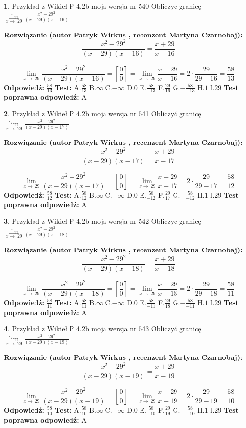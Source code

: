 \documentclass[12pt, a4paper]{article}
\theoremstyle{definition} %
\newtheorem{zad}{}
\newcommand{\zadStart}[1]{\begin{zad}#1\newline}
\newcommand{\zadStop}{\end{zad}}
\newcommand{\rozwStart}[2]{\noindent \textbf{Rozwiązanie (autor #1 , recenzent #2): }\newline}
\newcommand{\rozwStop}{\newline}
\newcommand{\odpStart}{\noindent \textbf{Odpowiedź:}\newline}
\newcommand{\odpStop}{\newline}
\newcommand{\testStart}{\noindent \textbf{Test:}\newline}
\newcommand{\testStop}{\newline}
\newcommand{\kluczStart}{\noindent \textbf{Test poprawna odpowiedź:}\newline}
\newcommand{\kluczStop}{\newline}
\begin{document}
\zadStart{Przykład z Wikieł P 4.2b moja wersja nr 540}
Obliczyć granicę $\lim\limits_{x\to\ 29}\frac{x^{2}-29^{2}}{(x-29)(x-16)}$.
\zadStop
\rozwStart{Patryk Wirkus}{Martyna Czarnobaj}
$$\frac{x^{2}-29^{2}}{(x-29)(x-16)}=\frac{x+29}{x-16}$$

$$\lim\limits_{x\to\ 29}\frac{x^{2}-29^{2}}{(x-29)(x-16)}=[\frac{0}{0}]=\lim\limits_{x\to\ 29}\frac{x+29}{x-16}=2 \cdot \frac{29}{29-16} = \frac{58}{13}$$
\rozwStop
\odpStart
$\frac{58}{13}$
\odpStop
\testStart
A.$\frac{58}{13}$
B.$\infty$
C.$-\infty$
D.$0$
E.$\frac{58}{-13}$
F.$\frac{29}{16}$
G.$-\frac{58}{-13}$
H.$1$
I.$29$
\testStop
\kluczStart
A
\kluczStop



\zadStart{Przykład z Wikieł P 4.2b moja wersja nr 541}
Obliczyć granicę $\lim\limits_{x\to\ 29}\frac{x^{2}-29^{2}}{(x-29)(x-17)}$.
\zadStop
\rozwStart{Patryk Wirkus}{Martyna Czarnobaj}
$$\frac{x^{2}-29^{2}}{(x-29)(x-17)}=\frac{x+29}{x-17}$$

$$\lim\limits_{x\to\ 29}\frac{x^{2}-29^{2}}{(x-29)(x-17)}=[\frac{0}{0}]=\lim\limits_{x\to\ 29}\frac{x+29}{x-17}=2 \cdot \frac{29}{29-17} = \frac{58}{12}$$
\rozwStop
\odpStart
$\frac{58}{12}$
\odpStop
\testStart
A.$\frac{58}{12}$
B.$\infty$
C.$-\infty$
D.$0$
E.$\frac{58}{-12}$
F.$\frac{29}{17}$
G.$-\frac{58}{-12}$
H.$1$
I.$29$
\testStop
\kluczStart
A
\kluczStop



\zadStart{Przykład z Wikieł P 4.2b moja wersja nr 542}
Obliczyć granicę $\lim\limits_{x\to\ 29}\frac{x^{2}-29^{2}}{(x-29)(x-18)}$.
\zadStop
\rozwStart{Patryk Wirkus}{Martyna Czarnobaj}
$$\frac{x^{2}-29^{2}}{(x-29)(x-18)}=\frac{x+29}{x-18}$$

$$\lim\limits_{x\to\ 29}\frac{x^{2}-29^{2}}{(x-29)(x-18)}=[\frac{0}{0}]=\lim\limits_{x\to\ 29}\frac{x+29}{x-18}=2 \cdot \frac{29}{29-18} = \frac{58}{11}$$
\rozwStop
\odpStart
$\frac{58}{11}$
\odpStop
\testStart
A.$\frac{58}{11}$
B.$\infty$
C.$-\infty$
D.$0$
E.$\frac{58}{-11}$
F.$\frac{29}{18}$
G.$-\frac{58}{-11}$
H.$1$
I.$29$
\testStop
\kluczStart
A
\kluczStop



\zadStart{Przykład z Wikieł P 4.2b moja wersja nr 543}
Obliczyć granicę $\lim\limits_{x\to\ 29}\frac{x^{2}-29^{2}}{(x-29)(x-19)}$.
\zadStop
\rozwStart{Patryk Wirkus}{Martyna Czarnobaj}
$$\frac{x^{2}-29^{2}}{(x-29)(x-19)}=\frac{x+29}{x-19}$$

$$\lim\limits_{x\to\ 29}\frac{x^{2}-29^{2}}{(x-29)(x-19)}=[\frac{0}{0}]=\lim\limits_{x\to\ 29}\frac{x+29}{x-19}=2 \cdot \frac{29}{29-19} = \frac{58}{10}$$
\rozwStop
\odpStart
$\frac{58}{10}$
\odpStop
\testStart
A.$\frac{58}{10}$
B.$\infty$
C.$-\infty$
D.$0$
E.$\frac{58}{-10}$
F.$\frac{29}{19}$
G.$-\frac{58}{-10}$
H.$1$
I.$29$
\testStop
\kluczStart
A
\kluczStop
\end{document}
